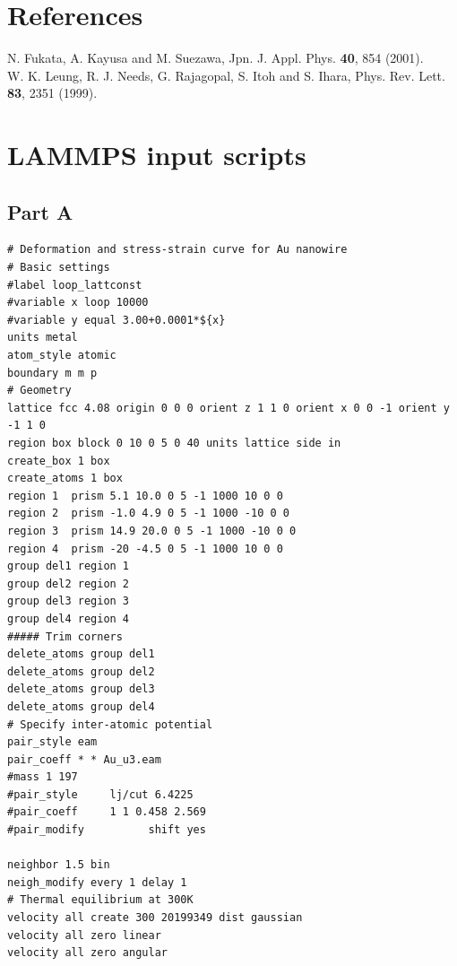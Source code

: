 \documentclass{article}
\begin{document}
\section*{References}
\begin{spacing}{1.0}
\small
\noindent
[1] N. Fukata, A. Kayusa and M. Suezawa, Jpn. J. Appl. Phys. \textbf{40}, 854 (2001).\\
[2] W. K. Leung, R. J. Needs, G. Rajagopal, S. Itoh and S. Ihara, Phys. Rev. Lett. \textbf{83}, 2351 (1999).
\newpage
\section*{LAMMPS input scripts}
\subsection*{Part A}
\begin{verbatim}
# Deformation and stress-strain curve for Au nanowire
# Basic settings
#label loop_lattconst
#variable x loop 10000
#variable y equal 3.00+0.0001*${x}
units metal
atom_style atomic
boundary m m p
# Geometry
lattice fcc 4.08 origin 0 0 0 orient z 1 1 0 orient x 0 0 -1 orient y -1 1 0
region box block 0 10 0 5 0 40 units lattice side in
create_box 1 box
create_atoms 1 box
region 1  prism 5.1 10.0 0 5 -1 1000 10 0 0
region 2  prism -1.0 4.9 0 5 -1 1000 -10 0 0
region 3  prism 14.9 20.0 0 5 -1 1000 -10 0 0
region 4  prism -20 -4.5 0 5 -1 1000 10 0 0
group del1 region 1
group del2 region 2
group del3 region 3
group del4 region 4
##### Trim corners
delete_atoms group del1
delete_atoms group del2
delete_atoms group del3
delete_atoms group del4
# Specify inter-atomic potential
pair_style eam
pair_coeff * * Au_u3.eam
#mass 1 197
#pair_style		lj/cut 6.4225
#pair_coeff		1 1 0.458 2.569
#pair_modify          shift yes

neighbor 1.5 bin
neigh_modify every 1 delay 1
# Thermal equilibrium at 300K
velocity all create 300 20199349 dist gaussian
velocity all zero linear
velocity all zero angular


\end{verbatim}
\end{spacing}
\end{document}
